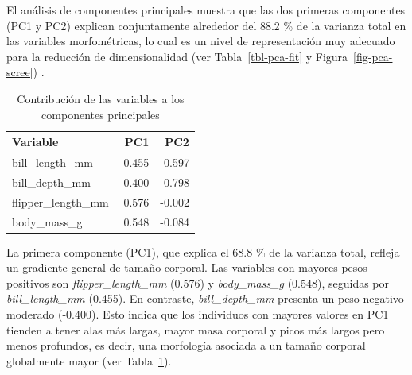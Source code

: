 \documentclass[
  spanish,
  11pt,
  a4paper,
  DIV=11,
  numbers=noendperiod]{scrartcl}
\newenvironment{Shaded}{\begin{snugshade}}{\end{snugshade}}
\newcommand{\AttributeTok}[1]{\textcolor[rgb]{0.40,0.45,0.13}{#1}}
\newcommand{\CommentTok}[1]{\textcolor[rgb]{0.37,0.37,0.37}{#1}}
\newcommand{\DecValTok}[1]{\textcolor[rgb]{0.68,0.00,0.00}{#1}}
\newcommand{\FunctionTok}[1]{\textcolor[rgb]{0.28,0.35,0.67}{#1}}
\newcommand{\NormalTok}[1]{\textcolor[rgb]{0.00,0.23,0.31}{#1}}
\newcommand{\OtherTok}[1]{\textcolor[rgb]{0.00,0.23,0.31}{#1}}
\newcommand{\SpecialCharTok}[1]{\textcolor[rgb]{0.37,0.37,0.37}{#1}}
\newcommand{\StringTok}[1]{\textcolor[rgb]{0.13,0.47,0.30}{#1}}
\begin{document}
El análisis de componentes principales muestra que las dos primeras
componentes (PC1 y PC2) explican conjuntamente alrededor del 88.2 \% de
la varianza total en las variables morfométricas, lo cual es un nivel de
representación muy adecuado para la reducción de dimensionalidad (ver
Tabla~\ref{tbl-pca-fit} y Figura~\ref{fig-pca-scree}) .

\begin{Shaded}
\end{Shaded}

\begin{longtable}[]{@{}lrr@{}}

\caption{\label{tbl-pca-loadings}Contribución de las variables a los
componentes principales}

\tabularnewline

\toprule\noalign{}
Variable & PC1 & PC2 \\
\midrule\noalign{}
\endhead
\bottomrule\noalign{}
\endlastfoot
bill\_length\_mm & 0.455 & -0.597 \\
bill\_depth\_mm & -0.400 & -0.798 \\
flipper\_length\_mm & 0.576 & -0.002 \\
body\_mass\_g & 0.548 & -0.084 \\

\end{longtable}

La primera componente (PC1), que explica el 68.8 \% de la varianza
total, refleja un gradiente general de tamaño corporal. Las variables
con mayores pesos positivos son \emph{flipper\_length\_mm} (0.576) y
\emph{body\_mass\_g} (0.548), seguidas por \emph{bill\_length\_mm}
(0.455). En contraste, \emph{bill\_depth\_mm} presenta un peso negativo
moderado (-0.400). Esto indica que los individuos con mayores valores en
PC1 tienden a tener alas más largas, mayor masa corporal y picos más
largos pero menos profundos, es decir, una morfología asociada a un
tamaño corporal globalmente mayor (ver Tabla~\ref{tbl-pca-loadings}).
\end{document}
